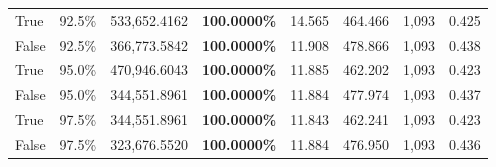 \begin{table}[H]
\begin{tabular}{lllrllll}
\cline{1-8}
True & 92.5\% & 533,652.4162 & \bfseries \color{red} 100.0000\% & 14.565 & 464.466 & 1,093 & 0.425 \\
\cline{1-8}
False & 92.5\% & 366,773.5842 & \bfseries \color{red} 100.0000\% & 11.908 & 478.866 & 1,093 & 0.438 \\
\cline{1-8}
True & 95.0\% & 470,946.6043 & \bfseries \color{red} 100.0000\% & 11.885 & 462.202 & 1,093 & 0.423 \\
\cline{1-8}
False & 95.0\% & 344,551.8961 & \bfseries \color{red} 100.0000\% & 11.884 & 477.974 & 1,093 & 0.437 \\
\cline{1-8}
True & 97.5\% & 344,551.8961 & \bfseries \color{red} 100.0000\% & 11.843 & 462.241 & 1,093 & 0.423 \\
\cline{1-8}
False & 97.5\% & 323,676.5520 & \bfseries \color{red} 100.0000\% & 11.884 & 476.950 & 1,093 & 0.436 \\
\cline{1-8}
\bottomrule
\end{tabular}
\end{table}
